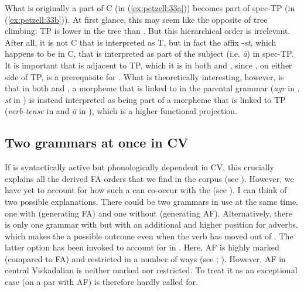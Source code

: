 \documentclass[output=paper,colorlinks,citecolor=brown,draft,draftmode]{langscibook}
\begin{document}
What is originally a part of C (in (\ref{ex:petzell:33a})) becomes part of spec-TP (in (\ref{ex:petzell:33b})). At first glance, this may seem like the opposite of tree climbing: TP is lower in the tree than . But this hierarchical order is irrelevant. After all, it is not C that is interpreted as T, but in fact the  affix -\textit{st}, which happens to be in C, that is interpreted as part of the subject (i.e. \textit{ä}) in spec-TP. It is important that  is adjacent to TP, which it is in both  and , since , on either side of TP, is a prerequisite for . What is theoretically interesting, however, is that in both  and , a morpheme that is linked to  in the parental grammar (\textit{agr} in , \textit{st} in ) is instead interpreted as being part of a morpheme that is linked to TP (\textit{verb-tense} in  and \textit{ä} in ), which is a higher functional projection.


\subsection{Two grammars at once in CV}\label{sec:petzell:5.3}


If  is syntactically active but phonologically dependent in CV, this crucially explains all the  derived FA orders that we find in the corpus (see ). However, we have yet to account for how such a  can co-occur with the  (see ). I can think of two possible explanations. There could be two grammars in use at the same time, one with  (generating FA) and one without  (generating AF). Alternatively, there is only one grammar with  but with an additional and higher position for adverbs, which makes the  a possible outcome even when the verb has moved out of . The latter option has been invoked to account for  in . Here, AF is highly marked (compared to FA) and restricted in a number of ways (see \citealt{BobaljikThrainsson1998}; \citealt{Thrainsson2007,Thrainsson2010}). However, AF in central Viskadalian is neither marked nor restricted. To treat it as an exceptional case (on a par with  AF) is therefore hardly called for.
\end{document}
